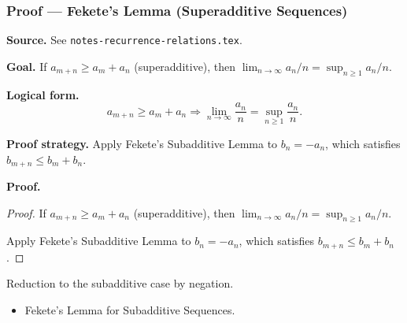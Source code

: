 
\clearpage
{}
\hypertarget{proof-RA-ABB-T-fekete-super}{}

\subsubsection[Fekete's Lemma (Superadditive Sequences)]{Proof --- Fekete's Lemma (Superadditive Sequences)}

\bigskip

\noindent
\textbf{Source.} See \texttt{notes-recurrence-relations.tex}.

\vspace{0.75em}

\noindent
\textbf{Goal.} If $a_{m+n} \ge a_m + a_n$ (superadditive), then $\lim_{n\to\infty} a_n/n = \sup_{n \ge 1} a_n/n$.

\vspace{0.75em}

\noindent
\textbf{Logical form.}
\[
  a_{m+n} \ge a_m + a_n \Rightarrow \lim_{n\to\infty} \frac{a_n}{n} = \sup_{n\ge 1} \frac{a_n}{n}.
\]

\vspace{0.75em}

\noindent
\textbf{Proof strategy.} Apply Fekete's Subadditive Lemma to $b_n = -a_n$, which satisfies $b_{m+n} \le b_m + b_n$.

\vspace{0.75em}

\noindent
\textbf{Proof.}
\begin{proof}
\Claim If $a_{m+n} \ge a_m + a_n$ (superadditive), then $\lim_{n\to\infty} a_n/n = \sup_{n \ge 1} a_n/n$.

\Given 

\Goal 

\Strategy Apply Fekete's Subadditive Lemma to $b_n = -a_n$, which satisfies $b_{m+n} \le b_m + b_n$.

\medskip


\end{proof}

\begin{remark*}
Reduction to the subadditive case by negation.
\end{remark*}

\begin{remark*}[Dependencies]
\begin{itemize}
  \item Fekete's Lemma for Subadditive Sequences.
\end{itemize}
\end{remark*}
